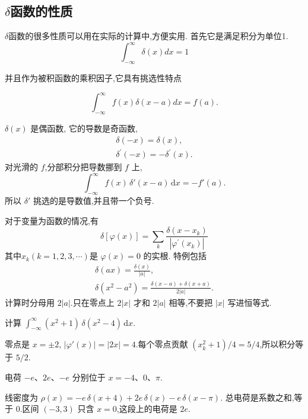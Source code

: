\subsection{$\delta$函数的性质}
$\delta$函数的很多性质可以用在实际的计算中,方便实用. 首先它是满足积分为单位1.
$$
\int_{-\infty}^{\infty} \delta(x) d x=1
$$

并且作为被积函数的乘积因子,它具有挑选性特点

$$
\int_{-\infty}^{\infty} f(x) \delta(x-a) d x=f(a).
$$

$\delta(x)$ 是偶函数, 它的导数是奇函数,
$$
\begin{gathered}
\delta(-x)=\delta(x), \\
\delta^{\prime}(-x)=-\delta^{\prime}(x) .
\end{gathered}
$$
对光滑的 $f$,分部积分把导数挪到 $f$ 上,
\begin{equation}
  \int_{-\infty}^{\infty} f(x)\,\delta'(x-a)\,\mathrm{d}x = -f'(a).
\end{equation}
所以 $\delta'$ 挑选的是导数值,并且带一个负号.

对于变量为函数的情况,有
\begin{equation}
    \delta[\varphi(x)]=\sum_k \frac{\delta\left(x-x_k\right)}{\left|\varphi^{\prime}\left(x_k\right)\right|}
\end{equation}
其中$x_k(k=1,2,3, \cdots)$是
$\varphi(x)=0$ 的实根.
特例包括
\begin{equation}
    \begin{gathered}
    \delta(a x)=\frac{\delta(x)}{|a|}, \\
    \delta\left(x^2-a^2\right)=\frac{\delta(x-a)+\delta(x+a)}{2|a|} .
    \end{gathered}
\end{equation}
计算时分母用 $2|a|$.只在零点上 $2|x|$ 才和 $2|a|$ 相等,不要把 $|x|$ 写进恒等式.

\begin{example}
计算 $\displaystyle\int_{-\infty}^{\infty}(x^2+1)\,\delta(x^2-4)\,\mathrm{d}x$.
\end{example}
\begin{solution}
零点是 $x=\pm 2$, $|\varphi'(x)|=|2x|=4$.每个零点贡献 $(x_k^2+1)/4=5/4$,所以积分等于 $5/2$.
\end{solution}

\begin{example}
电荷 $-e$、$2e$、$-e$ 分别位于 $x=-4$、$0$、$\pi$.
\end{example}
\begin{solution}
线密度为 $\rho(x)=-e\,\delta(x+4)+2e\,\delta(x)-e\,\delta(x-\pi)$.
总电荷是系数之和,等于 $0$.区间 $(-3,3)$ 只含 $x=0$,这段上的电荷是 $2e$.
\end{solution}

